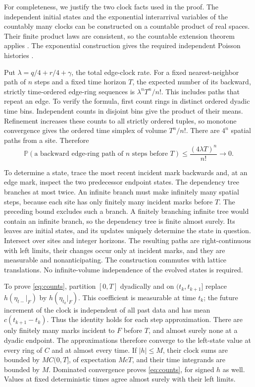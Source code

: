 \documentclass[11pt,a4paper]{article}
\newcommand{\Prob}{\mathbb P}
\begin{document}
For completeness, we justify the two clock facts used in the proof.
The independent initial states and the exponential interarrival
variables of the countably many clocks can be constructed on a
countable product of real spaces. Their finite product laws are
consistent, so the countable extension theorem applies
\cite[Section~2.1.4, Theorem~2.1.21]{PTE}.
The exponential construction gives the required independent Poisson
histories \cite[Section~3.7]{PTE}.

Put \(\lambda=q/4+r/4+\gamma\), the total edge-clock rate.
For a fixed nearest-neighbor path of \(n\) steps and a fixed time
horizon \(T\), the expected number of its backward, strictly
time-ordered edge-ring sequences is
\(\lambda^nT^n/n!\).
This includes paths that repeat an edge. To verify the formula, first
count rings in distinct ordered dyadic time bins. Independent counts
in disjoint bins give the product of their means. Refinement increases
these counts to all strictly ordered tuples, so monotone convergence
gives the ordered time simplex of volume \(T^n/n!\).
There are \(4^n\) spatial paths from a site. Therefore
\[
 \Prob(\text{a backward edge-ring path of \(n\) steps before \(T\)})
       \le\frac{(4\lambda T)^n}{n!}\longrightarrow0.
\]

To determine a state, trace the most recent incident mark backwards
and, at an edge mark, inspect the two predecessor endpoint states.
The dependency tree branches at most twice. An infinite branch must
make infinitely many spatial steps, because each site has only finitely
many incident marks before \(T\). The preceding bound excludes such a
branch. A finitely branching infinite tree would contain an infinite
branch, so the dependency tree is finite almost surely.
Its leaves are initial states, and its updates uniquely determine the
state in question. Intersect over sites and integer horizons.
The resulting paths are right-continuous with left limits, their
changes occur only at incident marks, and they are measurable and
nonanticipating. The construction commutes with lattice translations.
No infinite-volume independence of the evolved states is required.

To prove \eqref{eq:counts}, partition \([0,T]\) dyadically and on
\((t_k,t_{k+1}]\) replace \(h(\eta_{t-}|_F)\) by
\(h(\eta_{t_k}|_F)\). This coefficient is measurable at time \(t_k\);
the future increment of the clock is independent of all past data and
has mean \(c(t_{k+1}-t_k)\). Thus the identity holds for each step
approximation. There are only finitely many marks incident to \(F\)
before \(T\), and almost surely none at a dyadic endpoint. The
approximations therefore converge to the left-state value at every
ring of \(C\) and at almost every time. If \(|h|\le M\), their clock
sums are bounded by \(M C(0,T]\), of expectation \(McT\), and their time
integrands are bounded by \(M\). Dominated convergence proves
\eqref{eq:counts}, for signed \(h\) as well. Values at fixed deterministic
times agree almost surely with their left limits.
\end{document}
